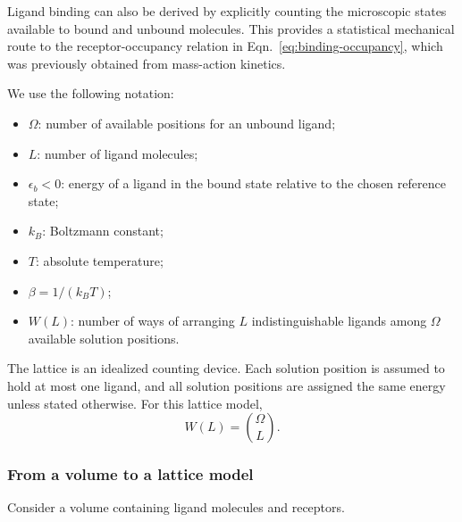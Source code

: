 Ligand binding can also be derived by explicitly counting the microscopic states available to bound and unbound molecules.
This provides a statistical mechanical route to the receptor-occupancy relation in Eqn.~\eqref{eq:binding-occupancy}, which was previously obtained from mass-action kinetics.

We use the following notation:

\begin{itemize}
    \item $\Omega$: number of available positions for an unbound ligand;
    \item $L$: number of ligand molecules;
    \item $\epsilon_b<0$: energy of a ligand in the bound state relative to the chosen reference state;
    \item $k_B$: Boltzmann constant;
    \item $T$: absolute temperature;
    \item $\beta=1/(k_BT)$;
    \item $W(L)$: number of ways of arranging $L$ indistinguishable ligands among $\Omega$ available solution positions.
\end{itemize}

The lattice is an idealized counting device.
Each solution position is assumed to hold at most one ligand, and all solution positions are assigned the same energy unless stated otherwise.
For this lattice model,
\[
    W(L)=\binom{\Omega}{L}.
\]

\subsubsection{From a volume to a lattice model}

Consider a volume containing ligand molecules and receptors.

